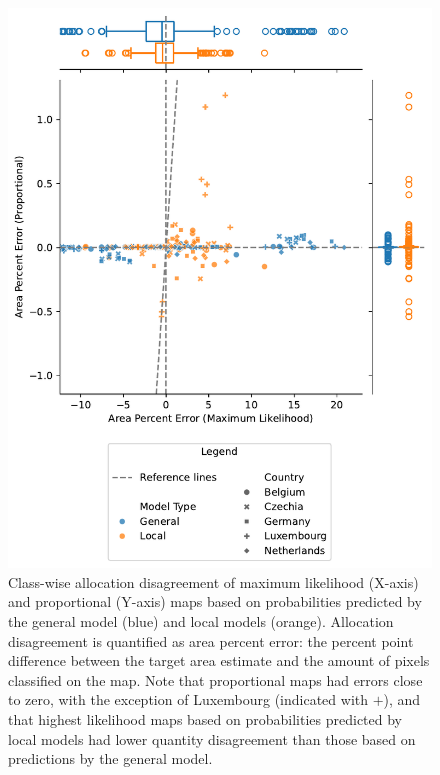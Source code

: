    \begin{figure}[H]
    \vspace{-2cm}
        \centering
        \includegraphics[width=\linewidth]{figs_04/fig11_jointplot_area_percent_error.pdf}
        \caption{Class-wise allocation disagreement of maximum likelihood (X-axis) and proportional (Y-axis) maps based on probabilities predicted by the general model (blue) and local models (orange). Allocation disagreement is quantified as area percent error: the percent point difference between the target area estimate and the amount of pixels classified on the map. Note that proportional maps had errors close to zero, with the exception of Luxembourg (indicated with $+$), and that highest likelihood maps based on probabilities predicted by local models had lower quantity disagreement than those based on predictions by the general model.}
        \label{fig:quantity_disagreement}
    \end{figure}
    
